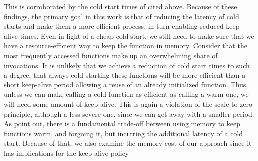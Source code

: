 This is corroborated by the cold start times of \citeauthor{Wang2018} cited above.
Because of these findings, the primary goal in this work is that of reducing the latency of cold starts and make them a more efficient process, in turn enabling reduced keep-alive times. Even in light of a cheap cold start, we still need to make sure that we have a resource-efficient way to keep the function in memory. Consider that the most frequently accessed functions make up an overwhelming share of invocations. It is unlikely that we achieve a reduction of cold start times to such a degree, that always cold starting these functions will be more efficient than a short keep-alive period allowing a reuse of an already initialized function. Thus, unless we can make calling a cold function as efficient as calling a warm one, we will need some amount of keep-alive. This is again a violation of the scale-to-zero principle, although a less severe one, since we can get away with a smaller period. As \citeauthor{Shahrad2020} point out, there is a fundamental trade-off between using memory to keep functions warm, and forgoing it, but incurring the additional latency of a cold start.
Because of that, we also examine the memory cost of our approach since it has implications for the keep-alive policy.

